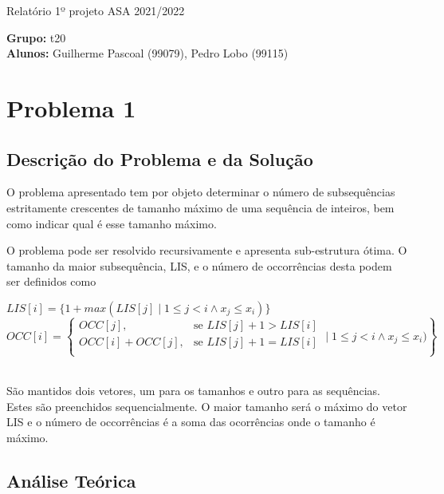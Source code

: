 \documentclass[12pt, letterpaper]{article}
\begin{document}
\begin{center}
	{\LARGE{Relatório 1º projeto ASA 2021/2022}}\\[\baselineskip]
\end{center}

\begin{flushleft}
	\textbf{Grupo:} t20\\
	\textbf{Alunos:} Guilherme Pascoal (99079), Pedro Lobo (99115)
\end{flushleft}


\section{Problema 1}
\subsection{Descrição do Problema e da Solução}

O problema apresentado tem por objeto determinar o número de subsequências
estritamente crescentes de tamanho máximo de uma sequência de inteiros, bem
como indicar qual é esse tamanho máximo.

O problema pode ser resolvido recursivamente e apresenta sub-estrutura ótima.
O tamanho da maior subsequência, LIS, e o número de occorrências desta podem ser
definidos como

\begin{center}
	${LIS[i] = \{1 + max(LIS[j] \mid 1 \leq j < i \land x_j \leq x_i)}\}$\\
	\[
    OCC[i] = \left\{\begin{array}{lr}
		OCC[j], & \text{se } LIS[j] + 1 > LIS[i]\\
		OCC[i] + OCC[j], & \text{se } LIS[j] + 1 = LIS[i]\\
        \end{array} \mid 1 \leq j < i \land x_j \leq x_i)\right\}
	\]\\[\baselineskip]

\end{center}

São mantidos dois vetores, um para os tamanhos e outro para as sequências.
Estes são preenchidos sequencialmente. O maior tamanho será o máximo do vetor
LIS e o número de occorrências é a soma das ocorrências onde o tamanho
é máximo.


\subsection{Análise Teórica}
\end{document}
